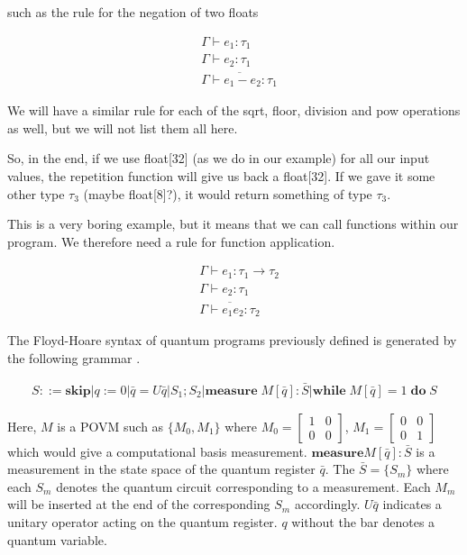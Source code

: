 \documentclass{article}
\begin{document}
\vspace{5mm}

such as the rule for the negation of two floats

\begin{align*}
    &\Gamma \vdash e_1: \tau_1 \\
    &\Gamma \vdash e_2: \tau_1 \\
    &\overline{\Gamma \vdash e_1 - e_2: \tau_1}
\end{align*}

\vspace{5mm}

We will have a similar rule for each of the sqrt, floor, division and pow operations as well, but we will not list them all here.

So, in the end, if we use float[32] (as we do in our example) for all our input values, the repetition function will give us back a float[32]. If we gave it some other type $\tau_3$ (maybe float[8]?), it would return something of type $\tau_3$. 

This is a very boring example, but it means that we can call functions within our program. We therefore need a rule for function application.

\begin{align*}
    &\Gamma \vdash e_1: \tau_1 \rightarrow \tau_2 \\
    &\Gamma \vdash e_2: \tau_1 \\
    &\overline{\Gamma \vdash e_1 e_2: \tau_2}
\end{align*}

The Floyd-Hoare syntax of quantum programs previously defined is generated by the following grammar \cite{ying_floyd--hoare_2012}.

\begin{align*}
    S ::= \textbf{skip} | q:=0|\bar{q}=U\bar{q}|S_1;S_2|\textbf{measure} \; M[\bar{q}]: \bar{S} | \textbf{while} \; M[\bar{q}] = 1 \; \textbf{do} \; S
\end{align*}

Here, $M$ is a POVM such as $\{M_0, M_1\}$ where $M_0 =\begin{bmatrix}
    1 & 0 \\
    0 & 0
\end{bmatrix}$, $M_1 = \begin{bmatrix}
    0 & 0 \\
    0 & 1
\end{bmatrix}$ which would give a computational basis measurement. $\textbf{measure} M[\bar{q}]: \bar{S}$ is a measurement in the state space of the quantum register $\bar{q}$. The $\bar{S} = \{S_m\}$ where each $S_m$ denotes the quantum circuit corresponding to a measurement. Each $M_m$ will be inserted at the end of the corresponding $S_m$ accordingly. $U \bar{q}$ indicates a unitary operator acting on the quantum register. $q$ without the bar denotes a quantum variable.
\end{document}
